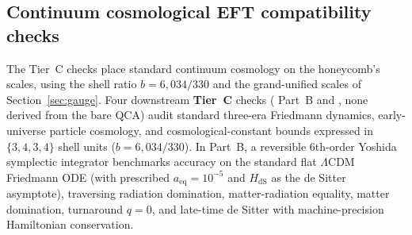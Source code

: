 \subsection{Continuum cosmological EFT compatibility checks}

The Tier~C checks place standard continuum cosmology on the honeycomb's scales, using the shell ratio
$b = 6{,}034/330$ and the grand-unified scales of Section~\ref{sec:gauge}. Four downstream \textbf{Tier~C} checks ( Part~B and ,
none derived from the bare QCA) audit standard three-era Friedmann dynamics, early-universe particle cosmology, and
cosmological-constant bounds expressed in $\{3,4,3,4\}$ shell units ($b = 6{,}034/330$). In  Part~B, a
reversible 6th-order Yoshida symplectic integrator \cite{yoshida1990} benchmarks accuracy on the standard flat $\Lambda$CDM
Friedmann ODE (with prescribed $a_{\mathrm{eq}} = 10^{-5}$ and $H_{\mathrm{dS}}$ as the de Sitter asymptote), traversing
radiation domination, matter-radiation equality, matter domination, turnaround $q = 0$, and late-time de Sitter with
machine-precision Hamiltonian conservation.

